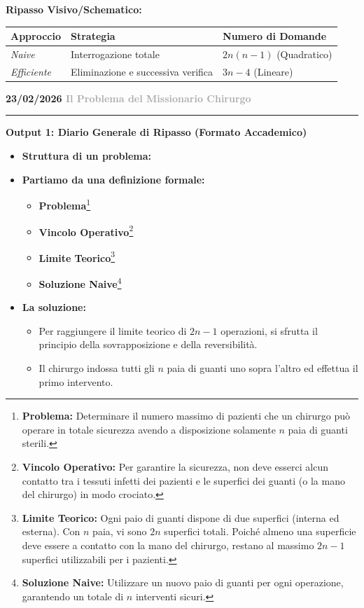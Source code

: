 \documentclass[a4paper, 11pt]{report}
\newcommand{\lezione}[2]{
\vspace{2em}
\noindent\textbf{\Large #1 \hfill \textcolor{darkgray}{#2}}
\vspace{0.5em}
\hrule
\vspace{1.5em}
}
\newcommand{\definizione}[2]{%
\textbf{#1}\footnote{\textbf{#1:} #2}%
}
\begin{document}
\textbf{Ripasso Visivo/Schematico:}
\begin{center}
\begin{tabular}{|l|l|l|}
\hline
\textbf{Approccio} & \textbf{Strategia} & \textbf{Numero di Domande} \\
\hline
\textit{Naive} & Interrogazione totale & $2n(n-1)$ (Quadratico) \\
\hline
\textit{Efficiente} & Eliminazione e successiva verifica & $3n-4$ (Lineare) \\
\hline
\end{tabular}
\end{center}

\lezione{23/02/2026}{Il Problema del Missionario Chirurgo}
\vspace{0.5cm}
\textbf{Output 1: Diario Generale di Ripasso (Formato Accademico)}
\begin{itemize}
\item \textbf{Struttura di un problema:}
\item \textbf{Partiamo da una definizione formale:}
\begin{itemize}
\item \definizione{Problema}{Determinare il numero massimo di pazienti che un chirurgo può operare in totale sicurezza avendo a disposizione solamente $n$ paia di guanti sterili.}
\item \definizione{Vincolo Operativo}{Per garantire la sicurezza, non deve esserci alcun contatto tra i tessuti infetti dei pazienti e le superfici dei guanti (o la mano del chirurgo) in modo crociato.}
\item \definizione{Limite Teorico}{Ogni paio di guanti dispone di due superfici (interna ed esterna). Con $n$ paia, vi sono $2n$ superfici totali. Poiché almeno una superficie deve essere a contatto con la mano del chirurgo, restano al massimo $2n - 1$ superfici utilizzabili per i pazienti.}
\item \definizione{Soluzione Naive}{Utilizzare un nuovo paio di guanti per ogni operazione, garantendo un totale di $n$ interventi sicuri.}
\end{itemize}
\item \textbf{La soluzione:}
\begin{itemize}
\item Per raggiungere il limite teorico di $2n-1$ operazioni, si sfrutta il principio della sovrapposizione e della reversibilità.
\item Il chirurgo indossa tutti gli $n$ paia di guanti uno sopra l'altro ed effettua il primo intervento.

\end{itemize}
\end{itemize}
\end{document}
